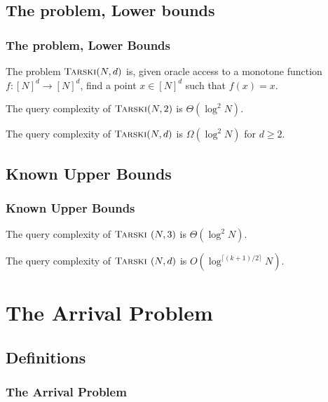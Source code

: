 \documentclass{beamer}
\begin{document}
\subsection{The problem, Lower bounds}

\begin{frame}
\frametitle{The problem, Lower Bounds}
    \begin{Definition}
        The problem $\textsc{Tarski}(N, d)$ is, given oracle access to a monotone function $f : [N]^d \to [N]^d$, find a point $x \in [N]^d$ such that
        $f(x) = x$.
    \end{Definition}
    \begin{Theorem}
        The query complexity of $\textsc{Tarski}(N, 2)$ is $\Theta(\log^2 N)$.
    \end{Theorem}
    \begin{Corollary}
        The query complexity of $\textsc{Tarski}(N, d)$ is $\Omega(\log^2 N)$ for $d \geq 2$.
    \end{Corollary}
\end{frame}


\newcommand{\trsk}{\textsc{Tarski }}

\subsection{Known Upper Bounds}
\begin{frame}
\frametitle{Known Upper Bounds}

\begin{Theorem}
    The query complexity of $\trsk(N, 3)$ is $\Theta(\log^2 N)$.
\end{Theorem}
\begin{Theorem}[Chen, Li]
    The query complexity of $\trsk(N, d)$ is $O(\log^{\lceil (k+1) / 2 \rceil} N)$.
\end{Theorem}

\end{frame}


\section{The Arrival Problem}
\subsection{Definitions}
\begin{frame}
\frametitle{The Arrival Problem}
    
    
\end{frame}
\end{document}
